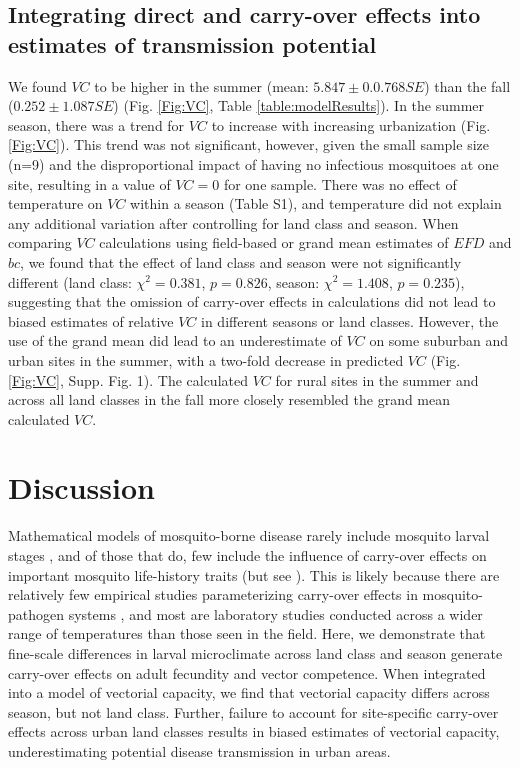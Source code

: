 \documentclass[12pt]{article}
\begin{document}
\subsection*{Integrating direct and carry-over effects into estimates of transmission potential}

We found $VC$ to be higher in the summer (mean: $5.847 \pm 0.0.768 SE$) than the fall ($0.252 \pm 1.087 SE$) (Fig. \ref{Fig:VC}, Table \ref{table:modelResults}).
In the summer season, there was a trend for $VC$ to increase with increasing urbanization (Fig. \ref{Fig:VC}).
This trend was not significant, however, given the small sample size (n=9) and the disproportional impact of having no infectious mosquitoes at one site, resulting in a value of $VC=0$ for one sample.
There was no effect of temperature on $VC$ within a season (Table S1), and temperature did not explain any additional variation after controlling for land class and season.
When comparing $VC$ calculations using field-based or grand mean estimates of $EFD$ and $bc$, we found that the effect of land class and season were not significantly different (land class: $\chi^2=0.381$, $p=0.826$, season: $\chi^2=1.408$, $p=0.235$), suggesting that the omission of carry-over effects in calculations did not lead to biased estimates of relative $VC$ in different seasons or land classes.
However, the use of the grand mean did lead to an underestimate of $VC$ on some suburban and urban sites in the summer, with a two-fold decrease in predicted $VC$ (Fig. \ref{Fig:VC}, Supp. Fig. 1).
The calculated $VC$ for rural sites in the summer and across all land classes in the fall more closely resembled the grand mean calculated $VC$.

\section*{Discussion}

Mathematical models of mosquito-borne disease rarely include mosquito larval stages \cite{reiner2013}, and of those that do, few include the influence of carry-over effects on important mosquito life-history traits (but see \cite{roux2015a}).
This is likely because there are relatively few empirical studies parameterizing carry-over effects in mosquito-pathogen systems \cite{parham2015}, and most are laboratory studies conducted across a wider range of temperatures than those seen in the field.
Here, we demonstrate that fine-scale differences in larval microclimate across land class and season generate carry-over effects on adult fecundity and vector competence.
When integrated into a model of vectorial capacity, we find that vectorial capacity differs across season, but not land class.
Further, failure to account for site-specific carry-over effects across urban land classes results in biased estimates of vectorial capacity, underestimating potential disease transmission in urban areas.
\end{document}
